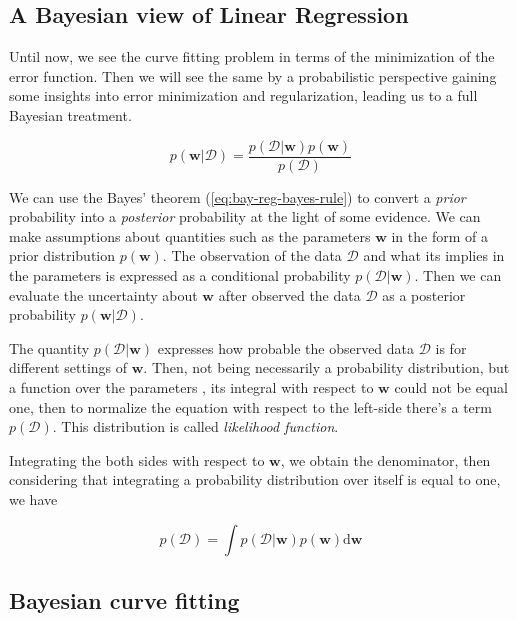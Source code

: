 \documentclass[11pt]{article} %
\begin{document}
\subsection{A Bayesian view of Linear Regression}

Until now, we see the curve fitting problem in terms of the minimization of the error function. Then we will see the same by a probabilistic perspective gaining some insights into error minimization and regularization, leading us to a full Bayesian treatment.

\begin{equation}
   \label{eq:bay-reg-bayes-rule}
   p(\mathbf{w} | \mathcal{D})=\frac{p(\mathcal{D} | \mathbf{w}) p(\mathbf{w})}{p(\mathcal{D})}
\end{equation}

We can use the Bayes' theorem (\ref{eq:bay-reg-bayes-rule}) to convert a \textit{prior} probability into a \textit{posterior} probability at the light of some evidence. We can make assumptions about quantities such as the parameters $\mathbf{w}$ in the form of a prior distribution $p(\mathbf{w})$. The observation of the data $\mathcal{D}$ and what its implies in the parameters is expressed as a conditional probability $p(\mathcal{D}|\mathbf{w})$. Then we can evaluate the uncertainty about $\mathbf{w}$ after observed the data $\mathcal{D}$ as a posterior probability $p(\mathbf{w}|\mathcal{D})$.

The quantity $p(\mathcal{D}|\mathbf{w})$ expresses how probable the observed data $\mathcal{D}$ is for different settings of $\mathbf{w}$. Then, not being necessarily a probability distribution, but a function over the parameters \cite{degroot2012probability}, its integral with respect to $\mathbf{w}$ could not be equal one, then to normalize the equation with respect to the left-side there's a term $p(\mathcal{D})$. This distribution is called \textit{likelihood function}.

Integrating the both sides with respect to $\mathbf{w}$, we obtain the denominator, then considering that integrating a probability distribution over itself is equal to one, we have

\begin{equation}
   \label{eq:bay-lin-bayes-theorem}
   p(\mathcal{D})=\int p(\mathcal{D} | \mathbf{w}) p(\mathbf{w}) \mathrm{d} \mathbf{w}
\end{equation}

\subsection{Bayesian curve fitting}
\end{document}
